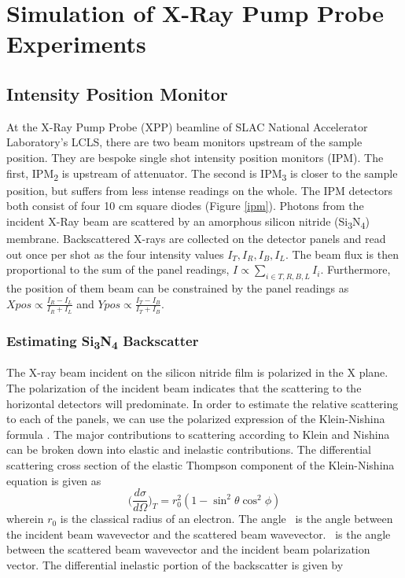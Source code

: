 \documentclass{report}
\begin{document}
\chapter{Simulation of X-Ray Pump Probe Experiments}

\section{Intensity Position Monitor}
At the X-Ray Pump Probe (XPP) beamline of SLAC National Accelerator Laboratory's LCLS, there are two beam monitors upstream of the sample position.
They are bespoke single shot intensity position monitors (IPM).
The first, IPM\textsubscript{2} is upstream of attenuator.
The second is IPM\textsubscript{3} is closer to the sample position, but suffers from less intense readings on the whole.
The IPM detectors both consist of four 10 cm square diodes (Figure \ref{ipm}).
Photons from the incident X-Ray beam are scattered by an amorphous silicon nitride (Si\textsubscript{3}N\textsubscript{4}) membrane.
Backscattered X-rays are collected on the detector panels and read out once per shot as the four intensity values $I_T, I_R, I_B, I_L$. 
The beam flux is then proportional to the sum of the panel readings, $I\propto \sum_{i\in T,R,B,L}I_i$. 
Furthermore, the position of them beam can be constrained by the panel readings as $Xpos\propto \frac{I_R-I_L} {I_R + I_L}$ and $Ypos\propto \frac{I_T-I_B} {I_T + I_B}$. 
    
\subsection{Estimating Si\textsubscript{3}N\textsubscript{4} Backscatter}
The X-ray beam incident on the silicon nitride film is polarized in the X plane. 
The polarization of the incident beam indicates that the scattering to the horizontal detectors will predominate. 
In order to estimate the relative scattering to each of the panels, we can use the polarized expression of the Klein-Nishina formula \cite{Klein1929-ic}. 
The major contributions to scattering according to Klein and Nishina can be broken down into elastic and inelastic contributions. 
The differential scattering cross section of the elastic Thompson component of the Klein-Nishina equation is given as \cite{Namito1993-tk}
\begin{equation}
\label{thompson}
\bigg( \frac {d\sigma}{d\Omega} \bigg)_T = r_0^2(1 - \sin^2\theta \cos^2 \phi)
\end{equation}
wherein $r_0$ is the classical radius of an electron. 
The angle \texttheta\ is the angle between the incident beam wavevector and the scattered beam wavevector. 
\textphi\ is the angle between the scattered beam wavevector and the incident beam polarization vector. 
The differential inelastic portion of the backscatter is given by \cite{Namito1993-tk}
 
\end{document}
